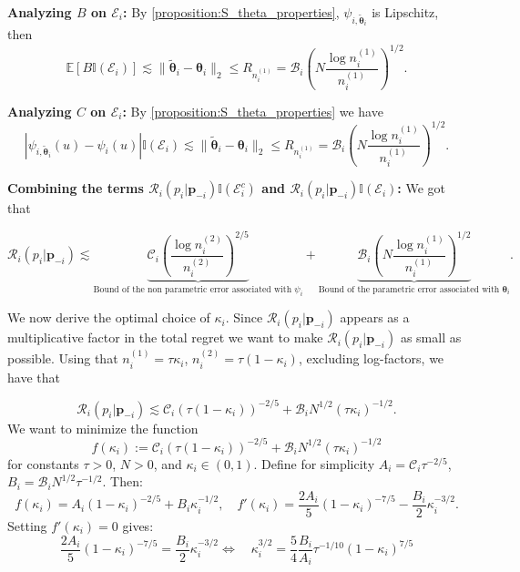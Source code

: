 \documentclass{article} %
\begin{document}
\textbf{Analyzing $B$ on $\mathcal{E}_i$:}
By \cref{proposition:S_theta_properties}, $\psi_{i,\widetilde{\boldsymbol{\theta}}_i}$ is Lipschitz, then 
$$\mathbb{E}[B\mathbb{I}(\mathcal{E}_i)]\lesssim \|\widetilde{\boldsymbol{\theta}}_i-\boldsymbol{\theta}_i\|_2 \leq R_{n_i^{(1)}}=\mathscr{B}_i\left(N\frac{\log n_i^{(1)}}{n_i^{(1)}}\right)^{1/2}.
$$

\textbf{Analyzing $C$ on $\mathcal{E}_i$:}
By \cref{proposition:S_theta_properties} we have 
$$
|\psi_{i,\widetilde{\boldsymbol{\theta}}_i}(u)-\psi_i(u)|\mathbb{I}(\mathcal{E}_i) \lesssim \|\widetilde{\boldsymbol{\theta}}_i-\boldsymbol{\theta}_i\|_2 \leq R_{n_i^{(1)}}=\mathscr{B}_i\left(N\frac{\log n_i^{(1)}}{n_i^{(1)}}\right)^{1/2}.
$$

\textbf{Combining the terms $\mathscr{R}_i(p_i|\mathbf{p}_{-i})\mathbb{I}(\mathcal{E}_i^c)$ and $\mathscr{R}_i(p_i|\mathbf{p}_{-i})\mathbb{I}(\mathcal{E}_i)$:} We got that 

$$
\mathscr{R}_i(p_i|\mathbf{p}_{-i}) \lesssim \underset{\text{Bound of the non parametric error associated with }\psi_i}{\underbrace{\mathscr{C}_i\left(\frac{\log n_i^{(2)}}{n_i^{(2)}}\right)^{2/5}}}+ \underset{\text{Bound of the parametric error associated with }\boldsymbol{\theta}_i}{\underbrace{\mathscr{B}_i\left(N\frac{\log n_i^{(1)}}{n_i^{(1)}}\right)^{1/2}}}.
$$

We now derive the optimal choice of $\kappa_i$. Since $\mathscr{R}_i(p_i|\mathbf{p}_{-i})$ appears as a multiplicative factor in the total regret we want to make $\mathscr{R}_i(p_i|\mathbf{p}_{-i}) $ as small as possible. Using that $n_i^{(1)}= \tau \kappa_i$, $n_i^{(2)}= \tau(1-\kappa_i)$, excluding log-factors, we have that 

$$
\mathscr{R}_i(p_i|\mathbf{p}_{-i}) \lesssim  \mathscr{C}_i(\tau(1-\kappa_i))^{-2/5}+ \mathscr{B}_iN^{1/2}(\tau \kappa_i)^{-1/2}.
$$
We want to minimize the function
\[
f(\kappa_i) := \mathscr{C}_i(\tau(1-\kappa_i))^{-2/5}+ \mathscr{B}_iN^{1/2}(\tau \kappa_i)^{-1/2}
\]
for constants $\tau > 0$, $N > 0$, and $\kappa_i \in (0,1)$. Define for simplicity $A_i = \mathscr{C}_i\tau^{-2/5}$, $B_i = \mathscr{B}_iN^{1/2} \tau^{-1/2}$. Then:
\[
f(\kappa_i) = A_i(1-\kappa_i)^{-2/5} + B_i \kappa_i^{-1/2}, \quad 
f'(\kappa_i) = \frac{2A_i}{5}(1-\kappa_i)^{-7/5} - \frac{B_i}{2}\kappa_i^{-3/2}.
\]
Setting $f'(\kappa_i) = 0$ gives:
\[
\frac{2A_i}{5}(1-\kappa_i)^{-7/5} = \frac{B_i}{2} \kappa_i^{-3/2} \Leftrightarrow\quad
\kappa_i^{3/2} = \frac{5}{4}\frac{B_i}{A_i} \tau^{-1/10}(1-\kappa_i)^{7/5}
\]
\end{document}
